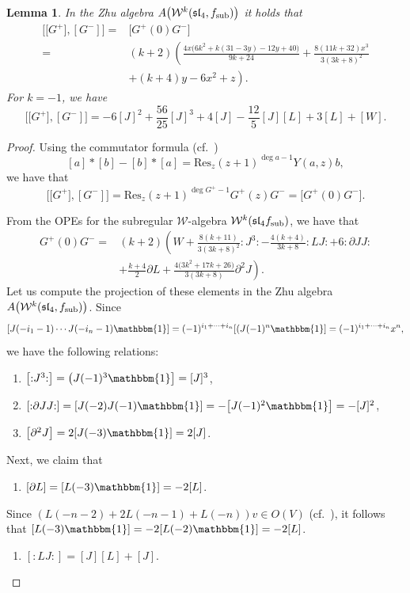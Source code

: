 \documentclass[pdftex]{sigma}
\numberwithin{equation}{section}
\newtheorem{Lemma}[Theorem]{Lemma}
\begin{document}
	
\begin{Lemma} \label{zhu-1}
		In the Zhu algebra $A\bigl(\mathcal{W}^{k}(\mathfrak{sl}_4, f_{\rm sub})\bigr)$ it holds that
	\begin{align*}
		\bigl[\bigl[G^+\bigr], [G^-]\bigr] ={}&\bigl[G^+(0)G^-\bigr] \\
		 ={}& (k+2) \left(\frac{4 x \bigl(6 k^2+k (31-3 y)-12 y+40\bigr)}{9 k+24}+\frac{8 (11 k+32) x^3}{3 (3 k+8)^2}\right.\\
&\left.+(k+4) y-6 x^2+z\right).
	\end{align*}
For $k=-1$, we have
\[
 \bigl[\bigl[G^+\bigr], [G^-]\bigr] = -6 [J]^2 + \frac{56}{25}[J]^3 + 4[J] - \frac{12}{5}[J] [L] + 3[L] + [W].
 \]
\end{Lemma}
		
	\begin{proof}
	Using the commutator formula (cf.\ \cite{Z})
	\[
 [a]*[b] - [b]*[a] = \text{Res}_z (z+1)^{\deg a -1} Y(a,z) b,
 \]
 we have that
 \[
 \bigl[\bigl[G^+\bigr], [G^-]\bigr] = \text{Res}_z (z+1)^{\deg G^+ -1} G^+(z)G^- = \bigl[G^+(0)G^-\bigr].
 \]
	
From the OPEs for the subregular $\mathcal W$-algebra $\mathcal{W}^{k}(\mathfrak{sl}_4 f_{\rm sub})$, we have that
		\begin{align*}
		G^+(0)G^- ={}& (k+2)\left(W +\frac{8(k+11)}{3(3k+8)^2}{:}J^3{:}-\frac{4(k+4)}{3k+8}{:}LJ{:} + 6{:}\partial JJ{:}\right. \\
	 &+ \left.\frac{k+4}{2}\partial L + \frac{4\bigl(3k^2+17k+26\bigr)}{3(3k+8)}\partial ^2J\right) .
		\end{align*}	
Let us compute the projection of these elements in the Zhu algebra $A\bigl(\mathcal{W}^{k}(\mathfrak{sl}_4, f_{\rm sub})\bigr)$.
Since
\[
[J(-i_1 -1)\cdots J(-i_n -1)\mathbbm{1}] = (-1)^{i_1 + \dots + i_n}[(J(-1)^n\mathbbm{1}] = (-1)^{i_1 + \dots + i_n}x^n,
\]
 we have the following relations:
\begin{enumerate}\itemsep=0pt
	\item[(1)] $\bigl[{:}J^3{:}\bigr]=\bigl(J(-1)^3\mathbbm{1}\bigr] = [J]^3$,
	\item[(2)] $[{:}\partial JJ{:}] = [J(-2)J(-1)\mathbbm{1}] = -\bigl[J(-1)^2\mathbbm{1}\bigr] = -[J]^2$,
	\item[(3)] $\bigl[\partial ^2J\bigr] = 2[J(-3)\mathbbm{1}] = 2[J]$.
\end{enumerate}

Next, we claim that
\begin{enumerate}
 \item[(4)] $[\partial L] = [L(-3)\mathbbm{1}] = -2[L]$.
\end{enumerate}	
Since
$(L(-n-2) + 2L(-n-1)+ L(-n))v \in O(V)$
(cf.\ \cite{Z}),	it follows that $[L(-3)\mathbbm{1}] = -2[L(-2)\mathbbm{1}] = -2[L] $.
\begin{enumerate}
 \item[(5)] $[{:}LJ{:}] = [J][L]+[J]$.
\end{enumerate}		
	

\end{proof}
\end{document}
